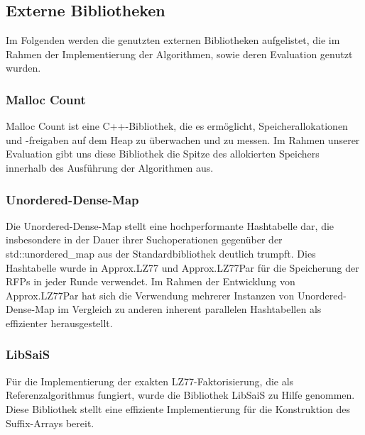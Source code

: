 \subsection{Externe Bibliotheken}
Im Folgenden werden die genutzten externen Bibliotheken aufgelistet, die im Rahmen der Implementierung der Algorithmen, sowie deren Evaluation genutzt wurden.
\subsubsection{Malloc Count} \label{malloccount}
Malloc Count\cite{malloc_count} ist eine C++-Bibliothek, die es ermöglicht, Speicherallokationen und -freigaben auf dem Heap zu überwachen und zu messen. Im
Rahmen unserer Evaluation gibt uns diese Bibliothek die Spitze des allokierten Speichers innerhalb des Ausführung der Algorithmen aus.

\subsubsection{Unordered-Dense-Map} \label{unordereddense}
Die Unordered-Dense-Map\cite{unordered_dense} stellt eine hochperformante Hashtabelle dar, die insbesondere in der Dauer ihrer Suchoperationen gegenüber
der std::unordered\_map aus der Standardbibliothek deutlich trumpft. Dies Hashtabelle wurde in Approx.LZ77 und Approx.LZ77Par für die Speicherung der
RFPs in jeder Runde verwendet. Im Rahmen der Entwicklung von Approx.LZ77Par hat sich die Verwendung mehrerer Instanzen von Unordered-Dense-Map im Vergleich
zu anderen inherent parallelen Hashtabellen\cite{oneapi}\cite{sharded_map} als effizienter herausgestellt.

\subsubsection{LibSaiS}
Für die Implementierung der exakten LZ77-Faktorisierung, die als Referenzalgorithmus fungiert, wurde die Bibliothek LibSaiS\cite{libsais} zu Hilfe genommen. Diese
Bibliothek stellt eine effiziente Implementierung für die Konstruktion des Suffix-Arrays bereit.

